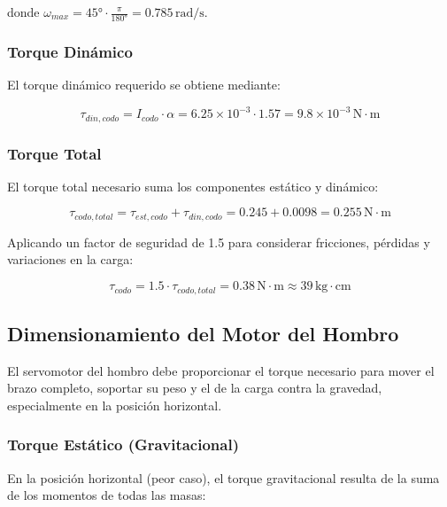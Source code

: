 donde $\omega_{max} = 45° \cdot \frac{\pi}{180°} = 0.785 \, \text{rad/s}$.

\subsubsection{Torque Dinámico}

El torque dinámico requerido se obtiene mediante:

\begin{equation}
\tau_{din,codo} = I_{codo} \cdot \alpha = 6.25 \times 10^{-3} \cdot 1.57 = 9.8 \times 10^{-3} \, \text{N} \cdot \text{m}
\end{equation}

\subsubsection{Torque Total}

El torque total necesario suma los componentes estático y dinámico:

\begin{equation}
\tau_{codo,total} = \tau_{est,codo} + \tau_{din,codo} = 0.245 + 0.0098 = 0.255 \, \text{N} \cdot \text{m}
\end{equation}

Aplicando un factor de seguridad de 1.5 para considerar fricciones, pérdidas y variaciones en la carga:

\begin{equation}
\tau_{codo} = 1.5 \cdot \tau_{codo,total} = 0.38 \, \text{N} \cdot \text{m} \approx 39 \, \text{kg} \cdot \text{cm}
\end{equation}

\subsection{Dimensionamiento del Motor del Hombro}

El servomotor del hombro debe proporcionar el torque necesario para mover el brazo completo, soportar su peso y el de la carga contra la gravedad, especialmente en la posición horizontal.

\subsubsection{Torque Estático (Gravitacional)}

En la posición horizontal (peor caso), el torque gravitacional resulta de la suma de los momentos de todas las masas:

